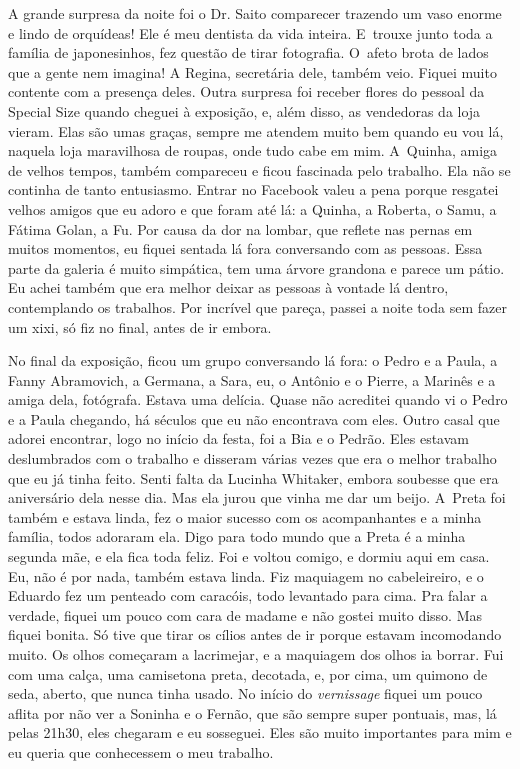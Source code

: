 A grande surpresa da noite foi o Dr. Saito comparecer trazendo um vaso
enorme e lindo de orquídeas! Ele é meu dentista da vida inteira. E~trouxe junto toda a família de japonesinhos, fez questão de tirar
fotografia. O~afeto brota de lados que a gente nem imagina! A Regina,
secretária dele, também veio. Fiquei muito contente com a presença
deles. Outra surpresa foi receber flores do pessoal da Special Size
quando cheguei à exposição, e, além disso, as vendedoras da loja vieram.
Elas são umas graças, sempre me atendem muito bem quando eu vou lá,
naquela loja maravilhosa de roupas, onde tudo cabe em mim. A~Quinha,
amiga de velhos tempos, também compareceu e ficou fascinada pelo
trabalho. Ela não se continha de tanto entusiasmo. Entrar no Facebook
valeu a pena porque resgatei velhos amigos que eu adoro e que foram até
lá: a Quinha, a Roberta, o Samu, a Fátima Golan, a Fu. Por causa da dor
na lombar, que reflete nas pernas em muitos momentos, eu fiquei sentada
lá fora conversando com as pessoas. Essa parte da galeria é muito
simpática, tem uma árvore grandona e parece um pátio. Eu achei também
que era melhor deixar as pessoas à vontade lá dentro, contemplando os
trabalhos. Por incrível que pareça, passei a noite toda sem fazer um
xixi, só fiz no final, antes de ir embora.

No final da exposição, ficou um grupo conversando lá fora: o Pedro e a
Paula, a Fanny Abramovich, a Germana, a Sara, eu, o Antônio e o Pierre,
a Marinês e a amiga dela, fotógrafa. Estava uma delícia. Quase não
acreditei quando vi o Pedro e a Paula chegando, há séculos que eu não
encontrava com eles. Outro casal que adorei encontrar, logo no início da
festa, foi a Bia e o Pedrão. Eles estavam deslumbrados com o trabalho e
disseram várias vezes que era o melhor trabalho que eu já tinha feito.
Senti falta da Lucinha Whitaker, embora soubesse que era aniversário
dela nesse dia. Mas ela jurou que vinha me dar um beijo. A~Preta foi
também e estava linda, fez o maior sucesso com os acompanhantes e a
minha família, todos adoraram ela. Digo para todo mundo que a Preta é a
minha segunda mãe, e ela fica toda feliz. Foi e voltou comigo, e dormiu
aqui em casa. Eu, não é por nada, também estava linda. Fiz maquiagem no
cabeleireiro, e o Eduardo fez um penteado com caracóis, todo levantado
para cima. Pra falar a verdade, fiquei um pouco com cara de madame e não
gostei muito disso. Mas fiquei bonita. Só tive que tirar os cílios antes
de ir porque estavam incomodando muito. Os olhos começaram a lacrimejar,
e a maquiagem dos olhos ia borrar. Fui com uma calça, uma camisetona
preta, decotada, e, por cima, um quimono de seda, aberto, que nunca
tinha usado. No início do \emph{vernissage} fiquei um pouco aflita por
não ver a Soninha e o Fernão, que são sempre super pontuais, mas, lá
pelas 21h30, eles chegaram e eu sosseguei. Eles são muito importantes
para mim e eu queria que conhecessem o meu trabalho.

